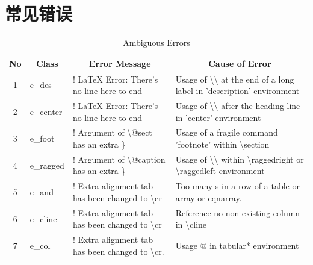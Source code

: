 \documentclass[12pt]{book}
\begin{document}
\section{常见错误}

\begin{table}
	\centering
	\caption{Ambiguous Errors}
	\begin{tabular}{|c|l|l|l|} 
		\hline
		No & \multicolumn{1}{c|}{Class} & \multicolumn{1}{c|}{Error Message}                            & \multicolumn{1}{c|}{Cause of Error}                                                                                          \\ 
		\hline
		1  & e\_des                     & ! LaTeX Error: There's no line here to end                    & Usage of \textbackslash{}\textbackslash{} at the end of a long label in 'description' environment                            \\ 
		\hline
		2  & e\_center                  & ! LaTeX Error: There's no line here to end                    & Usage of \textbackslash{}\textbackslash{} after the heading line in 'center' environment                                     \\ 
		\hline
		3  & e\_foot                    & ! Argument of \textbackslash{}@sect has an extra \}           & Usage of a fragile command 'footnote' within \textbackslash{}section                                                         \\ 
		\hline
		4  & e\_ragged                  & ! Argument of \textbackslash{}@caption has an extra \}        & Usage of \textbackslash{}\textbackslash{} within \textbackslash{}raggedright or \textbackslash{}raggedleft environment       \\ 
		\hline
		5  & e\_and                     & ! Extra alignment tab has been changed to \textbackslash{}cr  & Too many s in a row of a table or array or eqnarray.                                                                         \\ 
		\hline
		6  & e\_cline                   & ! Extra alignment tab has been changed to \textbackslash{}cr  & Reference no non existing column in \textbackslash{}cline                                                                    \\ 
		\hline
		7  & e\_col                     & ! Extra alignment tab has been changed to \textbackslash{}cr. & Usage @ in tabular* environment                                                                                              \\ 

\end{tabular}
\end{table}
\end{document}
